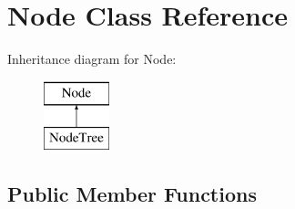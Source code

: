 \hypertarget{class_node}{}\section{Node Class Reference}
\label{class_node}
Inheritance diagram for Node\+:\begin{figure}[H]
\begin{center}
\leavevmode
\includegraphics[height=2.000000cm]{class_node}
\end{center}
\end{figure}
\subsection*{Public Member Functions}
